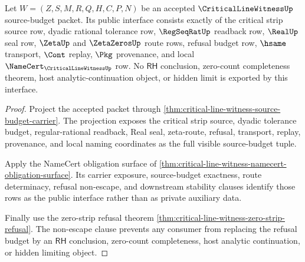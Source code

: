 \begin{theorem}
\label{thm:critical-line-witness-source-budget-public-interface}
Let $W=(Z,S,M,R,Q,H,C,P,N)$ be an accepted $\CriticalLineWitnessUp$
source-budget packet. Its public interface consists exactly of the critical
strip source row, dyadic rational tolerance row, $\RegSeqRatUp$ readback row,
$\RealUp$ seal row, $\ZetaUp$ and $\ZetaZerosUp$ route rows, refusal budget
row, $\hsame$ transport, $\Cont$ replay, $\Pkg$ provenance, and local
$\NameCert_{\CriticalLineWitnessUp}$ row. No $\mathsf{RH}$ conclusion,
zero-count completeness theorem, host analytic-continuation object, or
hidden limit is exported by this interface.
\end{theorem}
\begin{proof}
Project the accepted packet through
\autoref{thm:critical-line-witness-source-budget-carrier}. The projection
exposes the critical strip source, dyadic tolerance budget, regular-rational
readback, Real seal, zeta-route, refusal, transport, replay, provenance, and
local naming coordinates as the full visible source-budget tuple.

Apply the NameCert obligation surface of
\autoref{thm:critical-line-witness-namecert-obligation-surface}. Its carrier
exposure, source-budget exactness, route determinacy, refusal non-escape, and
downstream stability clauses identify those rows as the public interface
rather than as private auxiliary data.

Finally use the zero-strip refusal theorem
\autoref{thm:critical-line-witness-zero-strip-refusal}. The non-escape
clause prevents any consumer from replacing the refusal budget by an
$\mathsf{RH}$ conclusion, zero-count completeness, host analytic
continuation, or hidden limiting object.
\end{proof}
